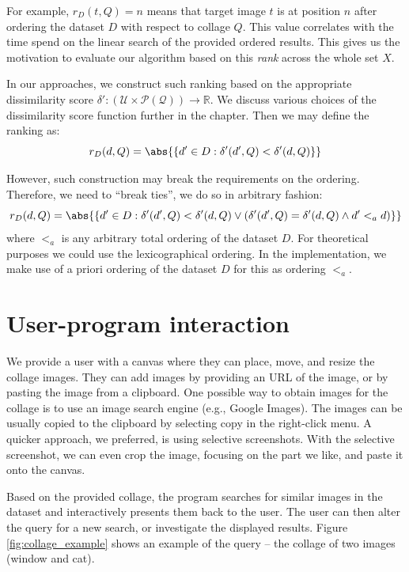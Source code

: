 
For example, $r_D(t, Q) = n$ means that target image $t$ is at position $n$ after ordering the dataset $D$ with respect to collage $Q$. This value correlates with the time spend on the linear search of the provided ordered results. This gives us the motivation to evaluate our algorithm based on this \emph{rank} across the whole set $X$.

In our approaches, we construct such ranking based on the appropriate dissimilarity score $\delta': (\mathcal{U} \times \mathcal{P(Q)}) \rightarrow \mathbb{R}$. We discuss various choices of the dissimilarity score function further in the chapter. Then we may define the ranking as:
$$
    r_D(d, Q) = \abs{\{d' \in D : \delta'(d', Q) < \delta'(d, Q)\}}
$$


However, such construction may break the requirements on the ordering. Therefore, we need to ``break ties'', we do so in arbitrary fashion:
$$
    r_D(d, Q) = \abs{\{d' \in D : \delta'(d', Q) < \delta'(d, Q) \lor (\delta'(d', Q) = \delta'(d, Q) \land d' <_a d)\}}
$$
where $<_a$ is any arbitrary total ordering of the dataset $D$. For theoretical purposes we could use the lexicographical ordering. In the implementation, we make use of a priori ordering of the dataset $D$ for this as ordering $<_a$.



\section{User-program interaction}

We provide a user with a canvas where they can place, move, and resize the collage images. They can add images by providing an URL of the image, or by pasting the image from a clipboard. One possible way to obtain images for the collage is to use an image search engine (e.g., Google Images). The images can be usually copied to the clipboard by selecting copy in the right-click menu. A quicker approach, we preferred, is using selective screenshots. With the selective screenshot, we can even crop the image, focusing on the part we like, and paste it onto the canvas.

Based on the provided collage, the program searches for similar images in the dataset and interactively presents them back to the user. The user can then alter the query for a new search, or investigate the displayed results. Figure \ref{fig:collage_example} shows an example of the query -- the collage of two images (window and cat). 


